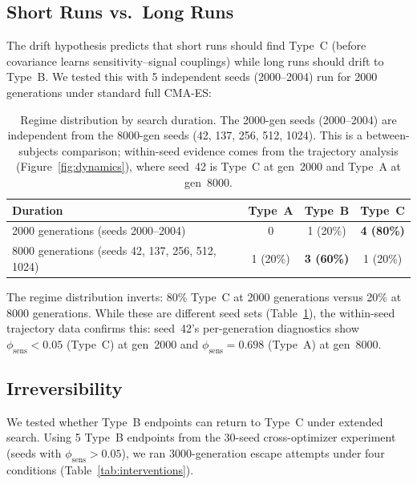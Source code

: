 \documentclass[twoside]{article}
\begin{document}
\subsection{Short Runs vs.\ Long Runs}

The drift hypothesis predicts that short runs should find Type~C (before
covariance learns sensitivity--signal couplings) while long runs should drift
to Type~B. We tested this with 5 independent seeds (2000--2004) run for
2000 generations under standard full CMA-ES:

\begin{table}[t]
\caption{Regime distribution by search duration. The 2000-gen seeds
(2000--2004) are independent from the 8000-gen seeds (42, 137, 256, 512, 1024).
This is a between-subjects comparison; within-seed evidence comes from the
trajectory analysis (Figure~\ref{fig:dynamics}), where seed~42 is Type~C at
gen~2000 and Type~A at gen~8000.}
\label{tab:duration}
\centering
\begin{tabular}{lccc}
\toprule
Duration & Type~A & Type~B & Type~C \\
\midrule
2000 generations (seeds 2000--2004) & 0 & 1 (20\%) & \textbf{4 (80\%)} \\
8000 generations (seeds 42, 137, 256, 512, 1024) & 1 (20\%) & \textbf{3 (60\%)} & 1 (20\%) \\
\bottomrule
\end{tabular}
\end{table}

The regime distribution inverts: 80\% Type~C at 2000 generations versus 20\%
at 8000 generations. While these are different seed sets (Table~\ref{tab:duration}),
the within-seed trajectory data confirms this: seed~42's
per-generation diagnostics show $\phi_{\text{sens}} < 0.05$ (Type~C) at gen~2000
and $\phi_{\text{sens}} = 0.698$ (Type~A) at gen~8000.

\subsection{Irreversibility}
\label{sec:irreversibility}

We tested whether Type~B endpoints can return to Type~C under extended
search. Using 5 Type~B endpoints from the 30-seed cross-optimizer experiment
(seeds with $\phi_{\text{sens}} > 0.05$), we ran 3000-generation escape
attempts under four conditions (Table~\ref{tab:interventions}).
\end{document}
